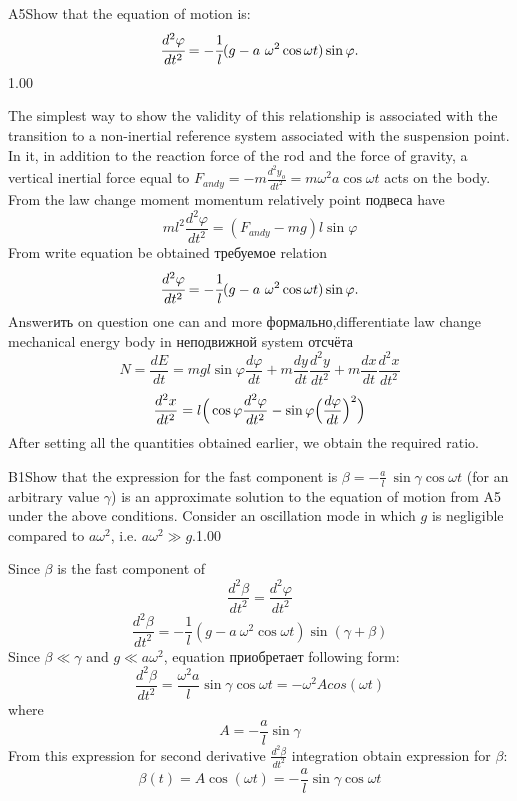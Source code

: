 \documentclass[11pt,a4paper]{article}
\begin{document}
\begin{solcard}{A5}{Show that the equation of motion is: $$ \cfrac{d^2\varphi}{dt^2}=-\cfrac{1}{l}(g-a~\omega^2\cos \omega t)\sin \varphi. $$}{1.00}

The simplest way to show the validity of this relationship is associated with the transition to a non-inertial reference system associated with the suspension point. In it, in addition to the reaction force of the rod and the force of gravity, a vertical inertial force equal to $F_{andy}=-m\frac{d^2y_o}{dt^2}=m{\omega}^2 a \cos{\omega}t$ acts on the body. $$ $$ From the law change moment momentum relatively point подвеса have $$m{l}^2\frac{d^2{\varphi}}{dt^2}=(F_{andy}-mg) l \sin{\varphi} $$ From write equation be obtained требуемое relation $$ \cfrac{d^2\varphi}{dt^2}=-\cfrac{1}{l}(g-a~\omega^2\cos \omega t)\sin \varphi. $$ Answerить on question one can and more формально,differentiate law change mechanical energy body in неподвижной system отсчёта $$N=\frac{dE}{dt}=mgl\sin{\varphi}\frac{d\varphi}{dt}+m\frac{dy}{dt}\frac{d^2y}{dt^2}+m\frac{dx}{dt}\frac{d^2x}{dt^2} $$ $$\frac{d^2x}{dt^2}=l\Bigr(\cos{\varphi}\frac{d^2{\varphi}}{dt^2}-\sin{\varphi}\Bigr(\frac{d\varphi}{dt}\Bigl)^{2}\Bigl) $$ After setting all the quantities obtained earlier, we obtain the required ratio.

\end{solcard}

\begin{solcard}{B1}{Show that the expression for the fast component is $\beta=-\frac{a}{l}~\sin\gamma \cos\omega t$ (for an arbitrary value $\gamma$) is an approximate solution to the equation of motion from A5 under the above conditions. Consider an oscillation mode in which $g$ is negligible compared to $a\omega^2$, i.e. $a\omega^2\gg g$.}{1.00}

Since $\beta$ is the fast component of $$\frac{d^2{\beta}}{dt^2}=\frac{d^2{\varphi}}{dt^2} $$ $$\frac{d^2{\beta}}{dt^2}=-\frac{1}{l}(g-a~\omega^2\cos \omega t)\sin (\gamma +\beta) $$ Since ${\beta} \ll {\gamma}$ and $g \ll a{\omega}^2$, equation приобретает following form: $$\frac{d^2{\beta}}{dt^2}=\frac{{\omega}^2 a}{l} \sin{\gamma} \cos {\omega}t=-{\omega}^2Acos({\omega}t)$$ where $$A=-\frac{a}{l}\sin{\gamma}$$ From this expression for second derivative $\frac{d^2{\beta}}{dt^2}$ integration obtain expression for ${\beta}$: $${\beta}(t)=A\cos({\omega}t)=-\frac{a}{l}\sin{\gamma} \cos {\omega}t$$

\end{solcard}
\end{document}
